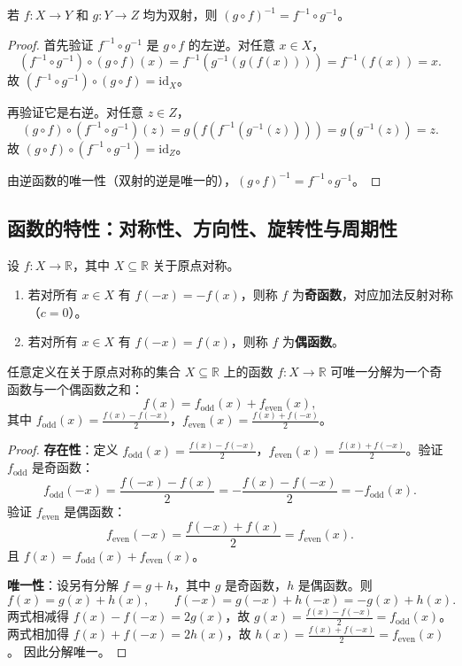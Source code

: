 \begin{proposition}[反函数复合的顺序反转]\label{prop:inverse_composition_order}
若 $f: X \to Y$ 和 $g: Y \to Z$ 均为双射，则 $(g \circ f)^{-1} = f^{-1} \circ g^{-1}$。
\end{proposition}

\begin{proof}
首先验证 $f^{-1} \circ g^{-1}$ 是 $g \circ f$ 的左逆。对任意 $x \in X$，
\[
(f^{-1} \circ g^{-1}) \circ (g \circ f)(x) = f^{-1}(g^{-1}(g(f(x)))) = f^{-1}(f(x)) = x.
\]
故 $(f^{-1} \circ g^{-1}) \circ (g \circ f) = \text{id}_X$。

再验证它是右逆。对任意 $z \in Z$，
\[
(g \circ f) \circ (f^{-1} \circ g^{-1})(z) = g(f(f^{-1}(g^{-1}(z)))) = g(g^{-1}(z)) = z.
\]
故 $(g \circ f) \circ (f^{-1} \circ g^{-1}) = \text{id}_Z$。

由逆函数的唯一性（双射的逆是唯一的），$(g \circ f)^{-1} = f^{-1} \circ g^{-1}$。
\end{proof}

\subsection{\texorpdfstring{函数的特性：对称性、方向性、旋转性与周期性}{函数的特性}}

\begin{definition}\label{def:parity}
设 $f: X \to \mathbb{R}$，其中 $X \subseteq \mathbb{R}$ 关于原点对称。
\begin{enumerate}[label=(\roman*)]
    \item 若对所有 $x \in X$ 有 $f(-x) = -f(x)$，则称 $f$ 为\textbf{奇函数}，对应加法反射对称（$c=0$）。
    \item 若对所有 $x \in X$ 有 $f(-x) = f(x)$，则称 $f$ 为\textbf{偶函数}。
\end{enumerate}
\end{definition}

\begin{theorem}[奇偶分解定理]\label{thm:parity_decomposition}
任意定义在关于原点对称的集合 $X \subseteq \mathbb{R}$ 上的函数 $f: X \to \mathbb{R}$ 可唯一分解为一个奇函数与一个偶函数之和：
\[f(x) = f_{\text{odd}}(x) + f_{\text{even}}(x),\]
其中 $f_{\text{odd}}(x) = \frac{f(x)-f(-x)}{2}$，$f_{\text{even}}(x) = \frac{f(x)+f(-x)}{2}$。
\end{theorem}

\begin{proof}
\textbf{存在性}：定义 $f_{\text{odd}}(x) = \frac{f(x)-f(-x)}{2}$，$f_{\text{even}}(x) = \frac{f(x)+f(-x)}{2}$。验证 $f_{\text{odd}}$ 是奇函数：
\[
f_{\text{odd}}(-x) = \frac{f(-x)-f(x)}{2} = -\frac{f(x)-f(-x)}{2} = -f_{\text{odd}}(x).
\]
验证 $f_{\text{even}}$ 是偶函数：
\[
f_{\text{even}}(-x) = \frac{f(-x)+f(x)}{2} = f_{\text{even}}(x).
\]
且 $f(x) = f_{\text{odd}}(x) + f_{\text{even}}(x)$。

\textbf{唯一性}：设另有分解 $f = g + h$，其中 $g$ 是奇函数，$h$ 是偶函数。则
\[
f(x) = g(x) + h(x), \qquad f(-x) = g(-x) + h(-x) = -g(x) + h(x).
\]
两式相减得 $f(x) - f(-x) = 2g(x)$，故 $g(x) = \frac{f(x)-f(-x)}{2} = f_{\text{odd}}(x)$。
两式相加得 $f(x) + f(-x) = 2h(x)$，故 $h(x) = \frac{f(x)+f(-x)}{2} = f_{\text{even}}(x)$。
因此分解唯一。
\end{proof}

